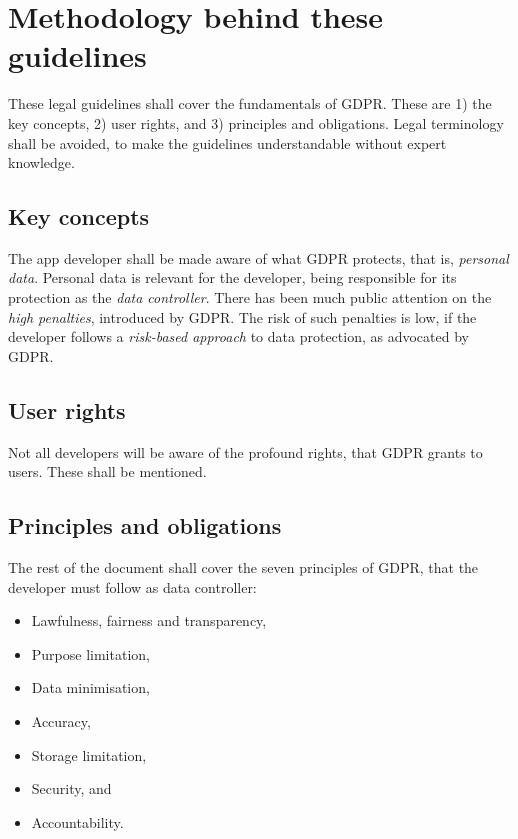 \documentclass[
]{book}
\providecommand{\tightlist}{%
  \setlength{\itemsep}{0pt}\setlength{\parskip}{0pt}}
\begin{document}
\hypertarget{methodology-behind-these-guidelines}{%
\section{Methodology behind these guidelines}\label{methodology-behind-these-guidelines}}

These legal guidelines shall cover the fundamentals of GDPR. These are 1) the key concepts, 2) user rights, and 3) principles and obligations. Legal terminology shall be avoided, to make the guidelines understandable without expert knowledge.

\hypertarget{key-concepts}{%
\subsection{Key concepts}\label{key-concepts}}

The app developer shall be made aware of what GDPR protects, that is, \emph{personal data}. Personal data is relevant for the developer, being responsible for its protection as the \emph{data controller}. There has been much public attention on the \emph{high penalties}, introduced by GDPR. The risk of such penalties is low, if the developer follows a \emph{risk-based approach} to data protection, as advocated by GDPR.

\hypertarget{user-rights}{%
\subsection{User rights}\label{user-rights}}

Not all developers will be aware of the profound rights, that GDPR grants to users. These shall be mentioned.

\hypertarget{principles-and-obligations}{%
\subsection{Principles and obligations}\label{principles-and-obligations}}

The rest of the document shall cover the seven principles of GDPR, that the developer must follow as data controller:

\begin{itemize}
\tightlist
\item
  Lawfulness, fairness and transparency,
\item
  Purpose limitation,
\item
  Data minimisation,
\item
  Accuracy,
\item
  Storage limitation,
\item
  Security, and
\item
  Accountability.
\end{itemize}
\end{document}
